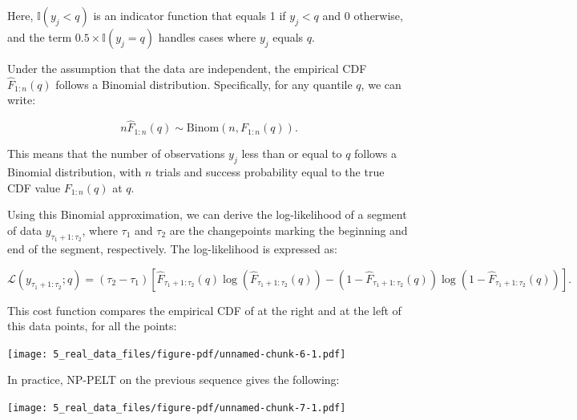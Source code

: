 \documentclass[
  letterpaper,
  DIV=11,
  numbers=noendperiod]{scrreprt}
\newenvironment{Shaded}{\begin{snugshade}}{\end{snugshade}}
\newcommand{\AttributeTok}[1]{\textcolor[rgb]{0.40,0.45,0.13}{#1}}
\newcommand{\DecValTok}[1]{\textcolor[rgb]{0.68,0.00,0.00}{#1}}
\newcommand{\FunctionTok}[1]{\textcolor[rgb]{0.28,0.35,0.67}{#1}}
\newcommand{\NormalTok}[1]{\textcolor[rgb]{0.00,0.23,0.31}{#1}}
\newcommand{\OtherTok}[1]{\textcolor[rgb]{0.00,0.23,0.31}{#1}}
\newcommand{\SpecialCharTok}[1]{\textcolor[rgb]{0.37,0.37,0.37}{#1}}
\newcommand{\StringTok}[1]{\textcolor[rgb]{0.13,0.47,0.30}{#1}}
\begin{document}
Here, \(\mathbb{I}(y_j < q)\) is an indicator function that equals 1 if
\(y_j < q\) and 0 otherwise, and the term
\(0.5 \times \mathbb{I}(y_j = q)\) handles cases where \(y_j\) equals
\(q\).

Under the assumption that the data are independent, the empirical CDF
\(\hat{F}_{1:n}(q)\) follows a Binomial distribution. Specifically, for
any quantile \(q\), we can write:

\[
n\hat{F}_{1:n}(q) \sim \mathrm{Binom}(n, F_{1:n}(q)).
\]

This means that the number of observations \(y_j\) less than or equal to
\(q\) follows a Binomial distribution, with \(n\) trials and success
probability equal to the true CDF value \(F_{1:n}(q)\) at \(q\).

Using this Binomial approximation, we can derive the log-likelihood of a
segment of data \(y_{\tau_1+1:\tau_2}\), where \(\tau_1\) and \(\tau_2\)
are the changepoints marking the beginning and end of the segment,
respectively. The log-likelihood is expressed as:

\[
\mathcal{L}(y_{\tau_1+1:\tau_2}; q) = (\tau_2 - \tau_1) \left[\hat{F}_{\tau_1+1:\tau_2}(q) \log(\hat{F}_{\tau_1+1:\tau_2}(q)) - (1-\hat{F}_{\tau_1+1:\tau_2}(q))\log(1-\hat{F}_{\tau_1+1:\tau_2}(q)) \right].
\]

This cost function compares the empirical CDF of at the right and at the
left of this data points, for all the points:

\texttt{[image: 5\_real\_data\_files/figure-pdf/unnamed-chunk-6-1.pdf]}

In practice, NP-PELT on the previous sequence gives the following:

\begin{Shaded}
\end{Shaded}

\texttt{[image: 5\_real\_data\_files/figure-pdf/unnamed-chunk-7-1.pdf]}
\end{document}
